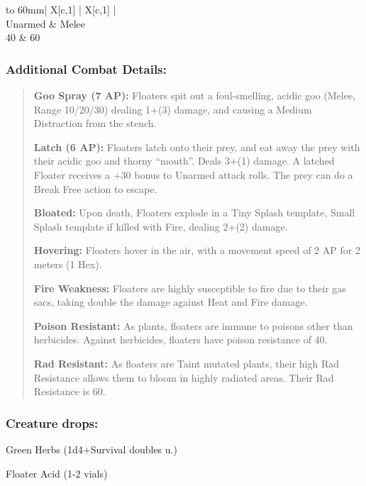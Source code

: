\documentclass[11pt,a4paper,twocolumn]{book}
\begin{document}
	\bigskip
	{
		\begin{tabu} to 60mm{| X[c,1] | X[c,1] |}
			\hline
			 \\ \hline
			Unarmed & Melee                                  \\
			40      & 60                                     \\ \hline
		\end{tabu}
		
	}
	
	\subsubsection*{Additional Combat Details:}
	\begin{verse}
		\textbf{Goo Spray (7 AP):} Floaters spit out a foul-smelling, acidic goo (Melee, Range 10/20/30) dealing 1+(3) damage, and causing a Medium Distraction from the stench. 
		
		\textbf{Latch (6 AP):} Floaters latch onto their prey, and eat away the prey with their acidic goo and thorny ``mouth''. Deals 3+(1) damage. A latched Floater receives a +30 bonus to Unarmed attack rolls. The prey can do a Break Free action to escape.
		
		\textbf{Bloated:} Upon death, Floaters explode in a Tiny Splash template, Small Splash template if killed with Fire, dealing 2+(2) damage.
		
		\textbf{Hovering:} Floaters hover in the air, with a movement speed of 2 AP for 2 meters (1 Hex).
		
		\textbf{Fire Weakness:} Floaters are highly susceptible to fire due to their gas sacs, taking double the damage against Heat and Fire damage.
		
		\textbf{Poison Resistant:} As plants, floaters are immune to poisons other than herbicides. Against herbicides, floaters have poison resistance of 40.
		
		\textbf{Rad Resistant:} As floaters are Taint mutated plants, their high Rad Resistance allows them to bloom in highly radiated areas. Their Rad Resistance is 60.
	\end{verse}
	
	\subsubsection*{Creature drops:}
	\begin{compactitem}
		\item Green Herbs (1d4+Survival doubles u.)
		\item Floater Acid (1-2 vials)
	\end{compactitem}
	
\end{document}
